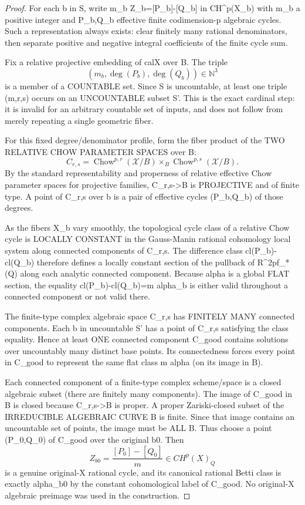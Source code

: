 \documentclass[11pt]{article}
\begin{document}
\begin{proof}
For each b in S, write
m_b Z_b=[P_b]-[Q_b] in CH^p(X_b)
with m_b a positive integer and
P_b,Q_b effective finite codimension-p
algebraic cycles.
Such a representation always exists:
clear finitely many rational denominators,
then separate positive and negative
integral coefficients of the finite cycle sum.

Fix a relative projective embedding of calX
over B. The triple
\[
(m_b,\deg(P_b),\deg(Q_b))\in\mathbb N^3
\]
is a member of a COUNTABLE set.
Since S is uncountable, at least one triple
(m,r,s) occurs on an UNCOUNTABLE subset S'.
This is the exact cardinal step:
it is invalid for an arbitrary countable
set of inputs, and does not follow from
merely repeating a single geometric fiber.

For this fixed degree/denominator profile, form
the fiber product of the TWO RELATIVE
CHOW PARAMETER SPACES over B:
\[
C_{r,s}=
\operatorname{Chow}^{p,r}(\mathcal X/B)
\times_B
\operatorname{Chow}^{p,s}(\mathcal X/B).
\]
By the standard representability and properness
of relative effective Chow parameter spaces
for projective families,
C_{r,s}->B is PROJECTIVE and of finite type.
A point of C_{r,s} over b is a pair of
effective cycles (P_b,Q_b) of those degrees.

As the fibers X_b vary smoothly,
the topological cycle class of a relative
Chow cycle is LOCALLY CONSTANT in the
Gauss-Manin rational cohomology local system
along connected components of C_{r,s}.
The difference class
cl(P_b)-cl(Q_b) therefore defines a
locally constant section of the pullback
of R^{2p}f_*(Q) along each analytic
connected component. Because alpha is a
global FLAT section, the equality
cl(P_b)-cl(Q_b)=m alpha_b
is either valid throughout a connected
component or not valid there.

The finite-type complex algebraic space
C_{r,s} has FINITELY MANY connected
components. Each b in uncountable S'
has a point of C_{r,s} satisfying
the class equality. Hence at least ONE
connected component C_good contains
solutions over uncountably many distinct
base points. Its connectedness forces
every point in C_good to represent
the same flat class m alpha (on its
image in B).

Each connected component of a finite-type
complex scheme/space is a closed algebraic
subset (there are finitely many components).
The image of C_good in B is closed
because C_{r,s}->B is proper.
A proper Zariski-closed subset of the
IRREDUCIBLE ALGEBRAIC CURVE B is finite.
Since that image contains an uncountable
set of points, the image must be ALL B.
Thus choose a point (P_0,Q_0) of
C_good over the original b0.
Then
\[
\boxed{
Z_{b0}=\frac{[P_0]-[Q_0]}{m}
\in CH^p(X)_Q
}
\]
is a genuine original-X rational cycle,
and its canonical rational Betti class
is exactly alpha_b0 by the constant
cohomological label of C_good.
No original-X algebraic preimage was used
in the construction.
\end{proof}
\end{document}
